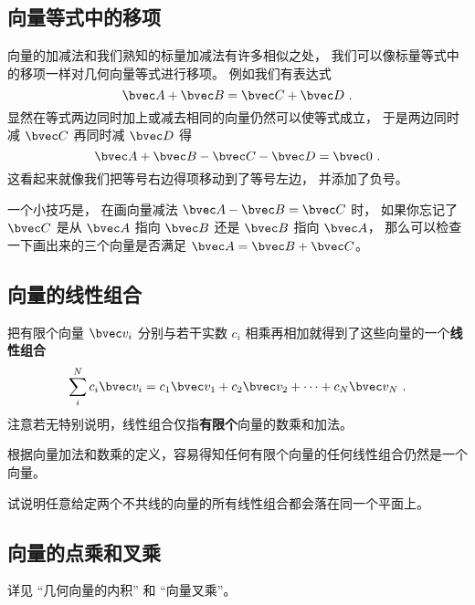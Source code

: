 \subsection{向量等式中的移项}
向量的加减法和我们熟知的标量加减法有许多相似之处， 我们可以像标量等式中的移项一样对几何向量等式进行移项。 例如我们有表达式
\begin{equation}
\bvec A + \bvec B = \bvec C + \bvec D~.
\end{equation}
显然在等式两边同时加上或减去相同的向量仍然可以使等式成立， 于是两边同时减 $\bvec C$ 再同时减 $\bvec D$ 得
\begin{equation}
\bvec A + \bvec B - \bvec C - \bvec D = \bvec 0~.
\end{equation}
这看起来就像我们把等号右边得项移动到了等号左边， 并添加了负号。

一个小技巧是， 在画向量减法 $\bvec A - \bvec B = \bvec C$ 时， 如果你忘记了 $\bvec C$ 是从 $\bvec A$ 指向 $\bvec B$ 还是 $\bvec B$ 指向 $\bvec A$， 那么可以检查一下画出来的三个向量是否满足 $\bvec A = \bvec B + \bvec C$。


\subsection{向量的线性组合}
把有限个向量 $\bvec v_i$ 分别与若干实数 $c_i$ 相乘再相加就得到了这些向量的一个\textbf{线性组合}
\begin{equation}\label{eq_GVecOp_1}
\sum_i^N c_i \bvec v_i = c_1\bvec v_1 + c_2\bvec v_2 +\dots +c_N \bvec v_N~.
\end{equation}
注意若无特别说明，线性组合仅指\textbf{有限个}向量的数乘和加法。

根据向量加法和数乘的定义，容易得知任何有限个向量的任何线性组合仍然是一个向量。

\begin{exercise}{}
试说明任意给定两个不共线的向量的所有线性组合都会落在同一个平面上。
\end{exercise}

\subsection{向量的点乘和叉乘}
详见 “几何向量的内积” 和 “向量叉乘”。

